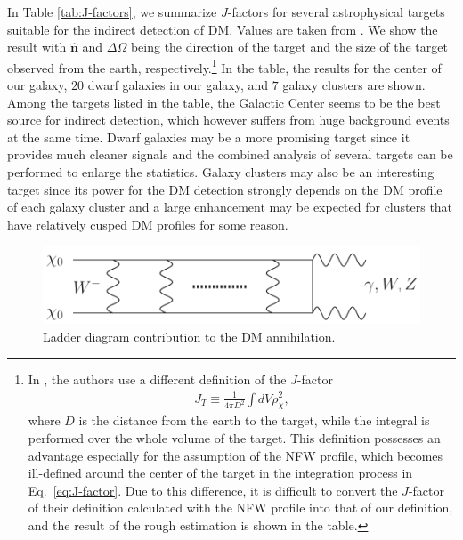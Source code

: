\documentclass[12pt,twoside,book]{article}
\begin{document}
In Table \ref{tab:J-factors}, we summarize $J$-factors for several astrophysical targets suitable for the indirect detection of DM.
Values are taken from \cite{Fornasa:2013iaa, Geringer-Sameth:2014yza, S_nchez_Conde_2011}.
We show the result with $\hat{\bm{n}}$ and $\Delta\Omega$ being the direction of the target and the size of the target observed from the earth, respectively.\footnote{
  In \cite{S_nchez_Conde_2011}, the authors use a different definition of the $J$-factor
  \begin{align}
    J_T \equiv \frac{1}{4\pi D^2} \int dV \rho_\chi^2,
  \end{align}
  where $D$ is the distance from the earth to the target, while the integral is performed over the whole volume of the target.
  This definition possesses an advantage especially for the assumption of the NFW profile, which becomes ill-defined around the center of the target in the integration process in Eq.~\eqref{eq:J-factor}.
  Due to this difference, it is difficult to convert the $J$-factor of their definition calculated with the NFW profile into that of our definition, and the result of the rough estimation is shown in the table.
}
In the table, the results for the center of our galaxy, $20$ dwarf galaxies in our galaxy, and $7$ galaxy clusters are shown.
Among the targets listed in the table, the Galactic Center seems to be the best source for indirect detection, which however suffers from huge background events at the same time.
Dwarf galaxies may be a more promising target since it provides much cleaner signals and the combined analysis of several targets can be performed to enlarge the statistics.
Galaxy clusters may also be an interesting target since its power for the DM detection strongly depends on the DM profile of each galaxy cluster and a large enhancement may be expected for clusters that have relatively cusped DM profiles for some reason.

\begin{figure}[t]
  \centering
  \includegraphics[width=0.7\hsize]{Sommerfeld.pdf}
  \caption{Ladder diagram contribution to the DM annihilation.}
  \label{fig:ladder}
\end{figure}
\end{document}
